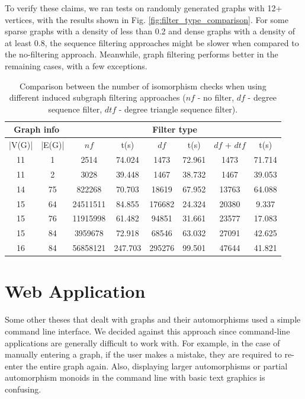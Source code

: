 To verify these claims, we ran tests on randomly generated graphs with 12+ vertices, with the results shown in Fig. \ref{fig:filter_type_comparison}. For some sparse graphs with a density of less than 0.2 and dense graphs with a density of at least 0.8, the sequence filtering approaches might be slower when compared to the no-filtering approach. Meanwhile, graph filtering performs better in the remaining cases, with a few exceptions.

\begin{table}
\begin{tabular}{ | c | c | c | c | c | c | c | c | }
\hline
\multicolumn{2}{|c|}{Graph info} & \multicolumn{6}{c|}{Filter type} \\
\hline
|V(G)| & |E(G)| & $nf$ & t(s) & $df$ & t(s) & $df$ + $dtf$ & t(s) \\
\hline
11 & 1 & 2514 & 74.024 & 1473 & 72.961 & 1473 & 71.714 \\
11 & 2 & 3028 & 39.448 & 1467 & 38.732 & 1467 & 39.053 \\
14 & 75 & 822268 & 70.703 & 18619 & 67.952 & 13763 & 64.088 \\
15 & 64 & 24511511 & 84.855 & 176682 & 24.324 & 20380 & 9.337 \\
15 & 76 & 11915998 & 61.482 & 94851 & 31.661 & 23577 & 17.083 \\
15 & 84 & 3959678 & 72.918 & 68546 & 63.032 & 27091 & 42.625 \\
16 & 84 & 56858121 & 247.703 & 295276 & 99.501 & 47644 & 41.821 \\
\hline
\end{tabular}
\caption{\label{table:isomorphic_calls} Comparison between the number of isomorphism checks when using different induced subgraph filtering approaches ($nf$ - no filter, $df$ - degree sequence filter, $dtf$ - degree triangle sequence filter).}
\end{table}

\section{Web Application}
\label{sec:web}

Some other theses that dealt with graphs and their automorphisms used a simple command line interface. We decided against this approach since command-line applications are generally difficult to work with. For example, in the case of manually entering a graph, if the user makes a mistake, they are required to re-enter the entire graph again. Also, displaying larger automorphisms or partial automorphism monoids in the command line with basic text graphics is confusing.

